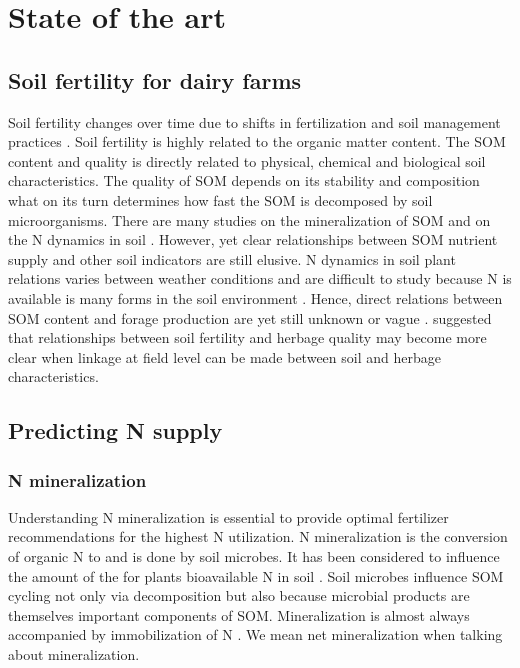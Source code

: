 \documentclass[10pt,twoside,dutch,english]{report}
\begin{document}
		
\chapter{State of the art} %
	\label{chap: state of the art}

\section{Soil fertility for dairy farms} 
Soil fertility changes over time due to shifts in fertilization and soil management practices \citep{Hanegraaf2009}. Soil fertility is highly related to the organic matter content. The SOM content and quality is directly related to physical, chemical and biological soil characteristics. The quality of SOM depends on its stability and composition what on its turn determines how fast the SOM is decomposed by soil microorganisms. There are many studies on the mineralization of SOM and on the N dynamics in soil \citep{Wander2004, Haynes2005,Ros2011}. However, yet clear relationships between SOM nutrient supply and other soil indicators are still elusive. N dynamics in soil plant relations varies between weather conditions and are difficult to study because N is available is many forms in the soil environment \citep{Nannipieri2009}. Hence, direct relations between SOM content and forage production are yet still unknown or vague \citep{Hanegraaf2009}. \citet{Reijneveld2014} suggested that relationships between soil fertility and herbage quality may become more clear when linkage at field level can be made between soil and herbage characteristics. 

\section{Predicting N supply }
\subsection{N mineralization}
Understanding N mineralization is essential to provide optimal fertilizer recommendations for the highest N utilization. N mineralization is the conversion of organic N to  and is done by soil microbes.  It has been considered to influence the amount of the for plants bioavailable N in soil \citep{Myrold2008, Geisseler2010}. Soil microbes influence SOM cycling not only via decomposition but also because microbial products are themselves important components of SOM. Mineralization is almost always accompanied by immobilization of N \citep{Powlson1993}. We mean net mineralization when talking about mineralization. 
\end{document}
